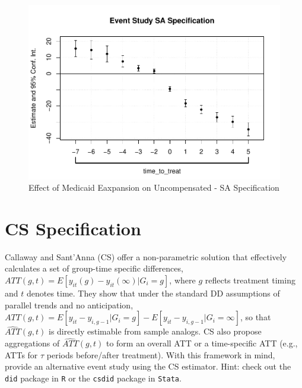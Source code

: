 \documentclass[
  12pt,
]{article}
\begin{document}
\begin{figure}
\centering
\includegraphics{Report_files/figure-latex/Fig-4-1.pdf}
\caption{Effect of Medicaid Eaxpansion on Uncompensated - SA
Specification}
\end{figure}

\newpage

\hypertarget{cs-specification}{%
\section{CS Specification}\label{cs-specification}}

Callaway and Sant'Anna (CS) offer a non-parametric solution that
effectively calculates a set of group-time specific differences,
\(ATT(g,t)= E[y_{it}(g) - y_{it}(\infty) | G_{i}=g]\), where \(g\)
reflects treatment timing and \(t\) denotes time. They show that under
the standard DD assumptions of parallel trends and no anticipation,
\(ATT(g,t) = E[y_{it} - y_{i, g-1} | G_{i}=g] - E[y_{it} - y_{i,g-1} | G_{i} = \infty]\),
so that \(\hat{ATT}(g,t)\) is directly estimable from sample analogs. CS
also propose aggregations of \(\hat{ATT}(g,t)\) to form an overall ATT
or a time-specific ATT (e.g., ATTs for \(\tau\) periods before/after
treatment). With this framework in mind, provide an alternative event
study using the CS estimator. Hint: check out the \texttt{did} package
in \texttt{R} or the \texttt{csdid} package in \texttt{Stata}.
\end{document}
